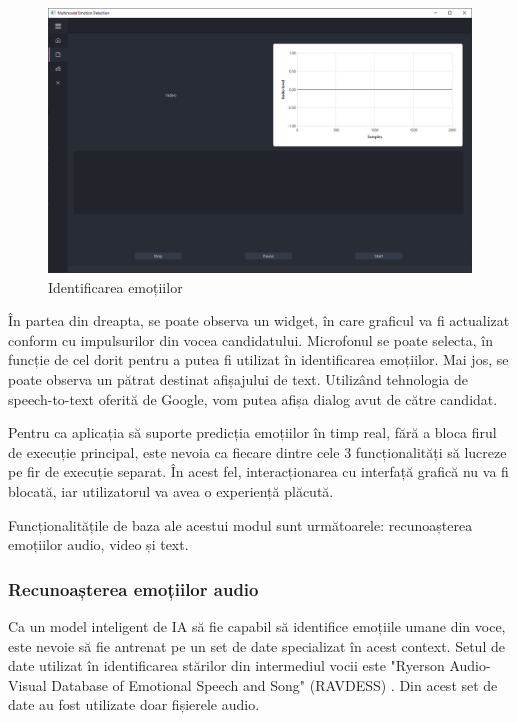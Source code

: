 \documentclass[a4paper, 12pt]{report}
\begin{document}
	\begin{figure}[H]
		\begin{center}
			\includegraphics[scale=0.4]{images/emotion_recognition_clean.png}
		\end{center}
		\caption{Identificarea emoțiilor}
		\label{fig:emotion_recog_clean}
	\end{figure} 
	
	În partea din dreapta, se poate observa un widget, în care graficul va fi actualizat conform cu impulsurilor din vocea candidatului. Microfonul se poate selecta, în funcție de cel dorit pentru a putea fi utilizat în identificarea emoțiilor. Mai jos, se poate observa un pătrat destinat afișajului de text. Utilizând tehnologia de speech-to-text oferită de Google, vom putea afișa dialog avut de către candidat.
	
	Pentru ca aplicația să suporte predicția emoțiilor în timp real, fără a bloca firul de execuție principal, este nevoia ca fiecare dintre cele 3 funcționalități să lucreze pe fir de execuție separat. În acest fel, interacționarea cu interfață grafică nu va fi blocată, iar utilizatorul va avea o experiență plăcută.
	
	Funcționalitățile de baza ale acestui modul sunt următoarele: recunoașterea emoțiilor audio, video și text.	
	
	\subsubsection{Recunoașterea emoțiilor audio}
	Ca un model inteligent de IA să fie capabil să identifice emoțiile umane din voce, este nevoie să fie antrenat pe un set de date specializat în acest context. Setul de date utilizat în identificarea stărilor din intermediul vocii este "Ryerson Audio-Visual Database of Emotional Speech and Song" (RAVDESS) \cite{ravdess}. Din acest set de date au fost utilizate doar fișierele audio.
\end{document}
